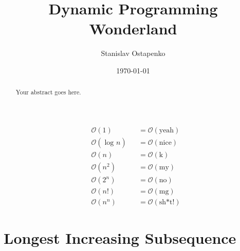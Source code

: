 \documentclass{article}
\begin{document}

    \title{Dynamic Programming Wonderland}
    \author{Stanislav Ostapenko}
    \date{\today}
    \maketitle

	\begin{abstract}
		Your abstract goes here.
	\end{abstract}

\clearpage

	\tableofcontents %
	\lstlistoflistings %

\clearpage %

\clearpage

	\thispagestyle{empty}

	\vspace*{\fill}
	\begin{center}
		\Huge
		\begin{align*}
			&   \mathcal{O}(1) &&= \mathcal{O}(\text{yeah})\\
			&    \mathcal{O}(\log_{} n) &&= \mathcal{O}(\text{nice})\\
			&    \mathcal{O}(n) &&= \mathcal{O}(\text{k})\\
			&    \mathcal{O}(n^{2}) &&= \mathcal{O}(\text{my})\\
			&    \mathcal{O}(2^{n}) &&= \mathcal{O}(\text{no})\\
			&    \mathcal{O}(n!) &&= \mathcal{O}(\text{mg})\\
			&    \mathcal{O}(n^{n}) &&= \mathcal{O}(\text{sh*t!})
		\end{align*}
	\end{center}
	\vspace*{\fill}


\clearpage %
\section{Longest Increasing Subsequence}
\end{document}
